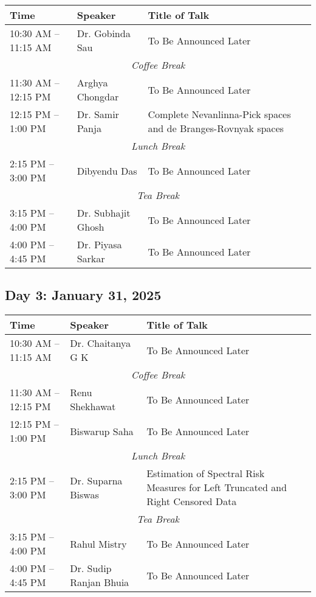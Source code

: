 \noindent
\renewcommand{\arraystretch}{1.5} %
\begin{tabular}{|p{3.5cm}|p{4cm}|p{7cm}|}
	\hline
	\textbf{Time} & \textbf{Speaker} & \textbf{Title of Talk} \\
	\hline
	10:30 AM -- 11:15 AM & Dr. Gobinda Sau & To Be Announced Later \\
	\hline
	\multicolumn{3}{|c|}{\textit{Coffee Break}} \\
	\hline
	11:30 AM -- 12:15 PM & Arghya Chongdar & To Be Announced Later \\
	\hline
	12:15 PM -- 1:00 PM & Dr. Samir Panja & Complete Nevanlinna-Pick spaces and de Branges-Rovnyak spaces \\
	\hline
	\multicolumn{3}{|c|}{\textit{Lunch Break}} \\
	\hline
	2:15 PM -- 3:00 PM & Dibyendu Das & To Be Announced Later \\
	\hline
	\multicolumn{3}{|c|}{\textit{Tea Break}} \\
	\hline
	3:15 PM -- 4:00 PM & Dr. Subhajit Ghosh & To Be Announced Later \\
	\hline
	4:00 PM -- 4:45 PM & Dr. Piyasa Sarkar & To Be Announced Later \\
	\hline

\end{tabular}

\subsection*{Day 3: January 31, 2025}

\noindent
\renewcommand{\arraystretch}{1.5} %
\begin{tabular}{|p{3.5cm}|p{4cm}|p{7cm}|}
	\hline
	\textbf{Time} & \textbf{Speaker} & \textbf{Title of Talk} \\
	\hline
	10:30 AM -- 11:15 AM & Dr. Chaitanya G K & To Be Announced Later \\
	\hline
	\multicolumn{3}{|c|}{\textit{Coffee Break}} \\
	\hline
	11:30 AM -- 12:15 PM & Renu Shekhawat & To Be Announced Later \\
	\hline
	12:15 PM -- 1:00 PM & Biswarup Saha & To Be Announced Later \\
	\hline
	\multicolumn{3}{|c|}{\textit{Lunch Break}} \\
	\hline
	2:15 PM -- 3:00 PM & Dr. Suparna Biswas & Estimation of Spectral Risk Measures for Left Truncated and Right Censored Data \\
	\hline
	\multicolumn{3}{|c|}{\textit{Tea Break}} \\
	\hline
	3:15 PM -- 4:00 PM & Rahul Mistry & To Be Announced Later \\
	\hline

	4:00 PM -- 4:45 PM & Dr. Sudip Ranjan Bhuia & To Be Announced Later \\
	\hline
\end{tabular}
